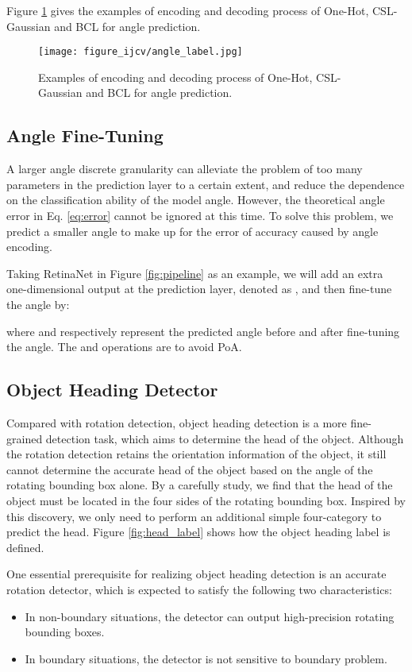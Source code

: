 \documentclass[10pt,journal,compsoc]{IEEEtran}
\begin{document}
Figure \ref{fig:angle_label} gives the examples of encoding and decoding process of One-Hot, CSL-Gaussian and BCL for angle prediction.

\begin{figure}[!tb]
	\centering
	\texttt{[image: figure\_ijcv/angle\_label.jpg]}
	\caption{Examples of encoding and decoding process of One-Hot, CSL-Gaussian and BCL for angle prediction.}
	\label{fig:angle_label}
\end{figure}

\subsection{Angle Fine-Tuning}\label{sec:angle_fine_tune}
A larger angle discrete granularity  can alleviate the problem of too many parameters in the prediction layer to a certain extent, and reduce the dependence on the classification ability of the model angle. However, the theoretical angle error in Eq. \ref{eq:error} cannot be ignored at this time. To solve this problem, we predict a smaller angle  to make up for the error of accuracy caused by angle encoding.


Taking RetinaNet in Figure \ref{fig:pipeline} as an example, we will add an extra one-dimensional output at the prediction layer, denoted as , and then fine-tune the angle by:

where  and  respectively represent the predicted angle before and after fine-tuning the angle. The  and  operations are to avoid PoA.

\subsection{Object Heading Detector}\label{sec:ohdet}
Compared with rotation detection, object heading detection is a more fine-grained detection task, which aims to determine the head of the object. Although the rotation detection retains the orientation information of the object, it still cannot determine the accurate head of the object based on the angle of the rotating bounding box alone. By a carefully study, we find that the head of the object must be located in the four sides of the rotating bounding box. Inspired by this discovery, we only need to perform an additional simple four-category to predict the head. Figure \ref{fig:head_label} shows how the object heading label is defined.

One essential prerequisite for realizing object heading detection is an accurate rotation detector, which is expected to satisfy the following two characteristics:
\begin{itemize}
	\item In non-boundary situations, the detector can output high-precision rotating bounding boxes.
	\item In boundary situations, the detector is not sensitive to boundary problem.
\end{itemize}
\end{document}
